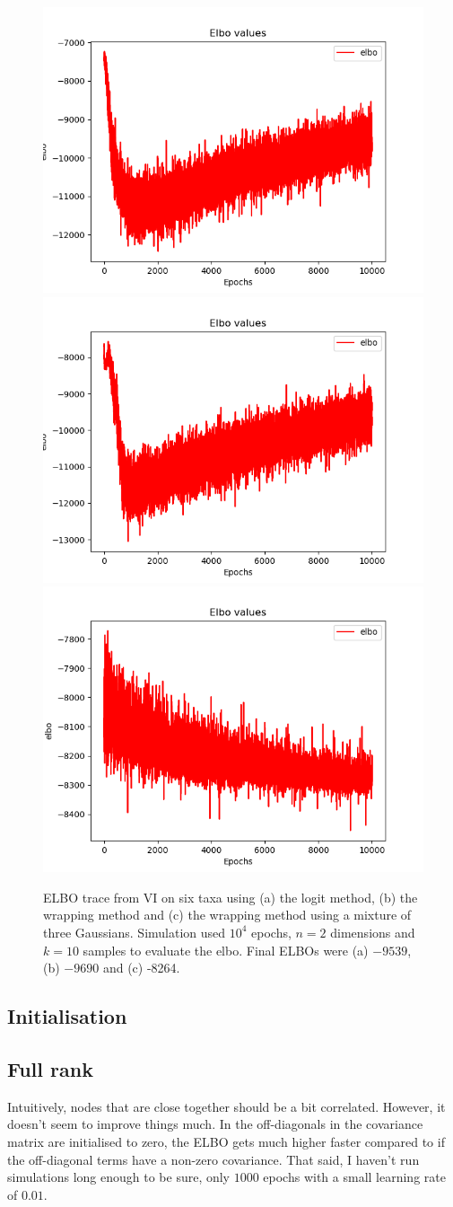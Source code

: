 \documentclass[11pt]{article}
\begin{document}
\begin{figure}[htbp]
\begin{center}
\includegraphics[width=.333\linewidth]{fig/elbo_trace_logit.png}%
\includegraphics[width=.333\linewidth]{fig/elbo_trace_wrap.png}%
\includegraphics[width=.333\linewidth]{fig/elbo_trace_wrap_B3.png}
\caption{ELBO trace from VI on six taxa using (a) the logit method, (b) the wrapping method and (c) the wrapping method using a mixture of three Gaussians. Simulation used $10^{4}$ epochs, $n=2$ dimensions and $k=10$ samples to evaluate the elbo. Final ELBOs were (a) $-9539$, (b) $-9690$ and (c) -8264.}
\label{fig:elbo}
\end{center}
\end{figure}

\subsection{Initialisation}

\subsection{Full rank}
Intuitively, nodes that are close together should be a bit correlated. However, it doesn't seem to improve things much. In the off-diagonals in the covariance matrix are initialised to zero, the ELBO gets much higher faster compared to if the off-diagonal terms have a non-zero covariance. That said, I haven't run simulations long enough to be sure, only $1000$ epochs with a small learning rate of $0.01$.
\end{document}
